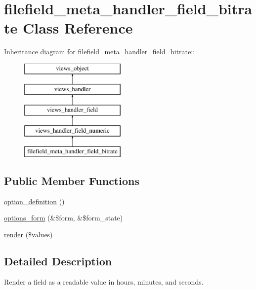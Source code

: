 \hypertarget{classfilefield__meta__handler__field__bitrate}{
\section{filefield\_\-meta\_\-handler\_\-field\_\-bitrate Class Reference}
\label{classfilefield__meta__handler__field__bitrate}
}
Inheritance diagram for filefield\_\-meta\_\-handler\_\-field\_\-bitrate::\begin{figure}[H]
\begin{center}
\leavevmode
\includegraphics[height=5cm]{classfilefield__meta__handler__field__bitrate}
\end{center}
\end{figure}
\subsection*{Public Member Functions}
\begin{CompactItemize}
\item 
\hyperlink{classfilefield__meta__handler__field__bitrate_678b8ef891e4b4024d22e2b914e20b15}{option\_\-definition} ()
\item 
\hyperlink{classfilefield__meta__handler__field__bitrate_74c60e6bbcee2bbaed721a9ed7eea05c}{options\_\-form} (\&\$form, \&\$form\_\-state)
\item 
\hyperlink{classfilefield__meta__handler__field__bitrate_8b49b6ccdf60cd91f344b3d781cdd51c}{render} (\$values)
\end{CompactItemize}


\subsection{Detailed Description}
Render a field as a readable value in hours, minutes, and seconds. 

